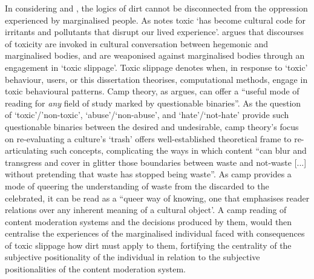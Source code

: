 In considering \citet{Hall:1997} and \citet{Lepawsky:2019}, the logics of dirt cannot be disconnected from the oppression experienced by marginalised people.
As \citet{Risam:2015} notes toxic `has become cultural code for irritants and pollutants that disrupt our lived experience'.
\citet{Risam:2015} argues that discourses of toxicity are invoked in cultural conversation between hegemonic and marginalised bodies, and are weaponised against marginalised bodies through an engagement in `toxic slippage'.
Toxic slippage denotes when, in response to `toxic' behaviour, users, or this dissertation theorises, computational methods, engage in toxic behavioural patterns.
Camp theory, as \citet{Schaffer:2015} argues, can offer a ``useful mode of reading for \textit{any} field of study marked by questionable binaries''.
As the question of `toxic'/'non-toxic', `abuse'/`non-abuse', and `hate'/`not-hate' provide such questionable binaries between the desired and undesirable, camp theory's focus on re-evaluating a culture's `trash' offers well-established theoretical frame to re-articulating such concepts, complicating the ways in which content ``can blur and transgress and cover in glitter those boundaries between waste and not-waste [...] without pretending that waste has stopped being waste''\citep{Schaffer:2015}.
As camp provides a mode of queering the understanding of waste from the discarded to the celebrated, it can be read as a ``queer way of knowing, one that emphasises reader relations over any inherent meaning of a cultural object'.
A camp reading of content moderation systems and the decisions produced by them, would then centralise the experiences of the marginalised individual faced with consequences of toxic slippage how dirt must apply to them, fortifying the centrality of the subjective positionality of the individual in relation to the subjective positionalities of the content moderation system.

